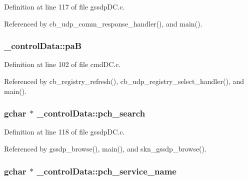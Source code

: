 Definition at line 117 of file gssdp\+D\+C.\+c.



Referenced by cb\+\_\+udp\+\_\+comm\+\_\+response\+\_\+handler(), and main().

\subsubsection[{\texorpdfstring{paB}{paB}}]{ \+\_\+control\+Data\+::paB}\hypertarget{struct__control_data_a93f6e099a56c0d476607b4bd5a9dfa58}{}\label{struct__control_data_a93f6e099a56c0d476607b4bd5a9dfa58}


Definition at line 102 of file cmd\+D\+C.\+c.



Referenced by cb\+\_\+registry\+\_\+refresh(), cb\+\_\+udp\+\_\+registry\+\_\+select\+\_\+handler(), and main().

\subsubsection[{\texorpdfstring{pch\+\_\+search}{pch_search}}]{\setlength{\rightskip}{0pt plus 5cm}gchar $\ast$ \+\_\+control\+Data\+::pch\+\_\+search}\hypertarget{struct__control_data_aae1d10aba11260e77341d9f5fa6055e2}{}\label{struct__control_data_aae1d10aba11260e77341d9f5fa6055e2}


Definition at line 118 of file gssdp\+D\+C.\+c.



Referenced by gssdp\+\_\+browse(), main(), and skn\+\_\+gssdp\+\_\+browse().

\subsubsection[{\texorpdfstring{pch\+\_\+service\+\_\+name}{pch_service_name}}]{\setlength{\rightskip}{0pt plus 5cm}gchar $\ast$ \+\_\+control\+Data\+::pch\+\_\+service\+\_\+name}\hypertarget{struct__control_data_a2197fd3d9315510193866dbedbd3cc8b}{}\label{struct__control_data_a2197fd3d9315510193866dbedbd3cc8b}


